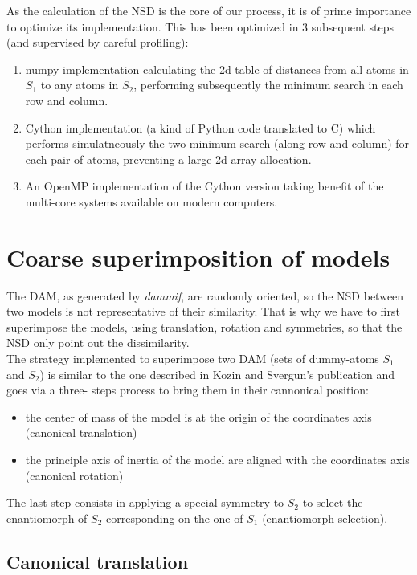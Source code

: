 \documentclass[a4paper, 11pt]{report}
\begin{document}
As the calculation of the NSD is the core of our process, it is of prime  
importance to optimize its implementation. This has been optimized in 3
subsequent steps (and supervised by careful profiling):
\begin{enumerate}
  \item numpy implementation calculating the 2d table of distances from all
  atoms in $S_{1}$ to any atoms in $S_{2}$, performing subsequently the minimum
  search in each row and column.
  \item Cython implementation \cite{cython} (a kind of Python code translated
  to C) which performs simulatneously the two minimum search (along row and
  column) for each pair of atoms, preventing a large 2d array allocation.
  \item An OpenMP \cite{openmp} implementation of the Cython version taking
  benefit of the multi-core systems available on modern computers.
\end{enumerate}

\section{Coarse superimposition of models}

The DAM, as generated by \textit{dammif}, are randomly oriented, so the NSD
between two models is not representative of their similarity.
That is why we have to first superimpose the models, using translation, rotation
and symmetries, so that the NSD only point out the dissimilarity.\\

The strategy implemented to superimpose two DAM (sets of
dummy-atoms $S_{1}$ and $S_{2}$) is similar to the one described in 
Kozin and Svergun's publication \cite{supcomb} and goes via a three-
steps process to bring them in their cannonical position:
\begin{itemize}
  \item the center of mass of the model is at the origin of the 
        coordinates axis (canonical translation)
  \item the principle axis of inertia of the model are aligned with 
        the coordinates axis (canonical rotation)
\end{itemize}
The last step consists in applying a special symmetry to $S_{2}$ to 
select the enantiomorph of $S_{2}$ corresponding on the one of $S_{1}$ 
(enantiomorph selection).

\subsection{Canonical translation}
\end{document}
